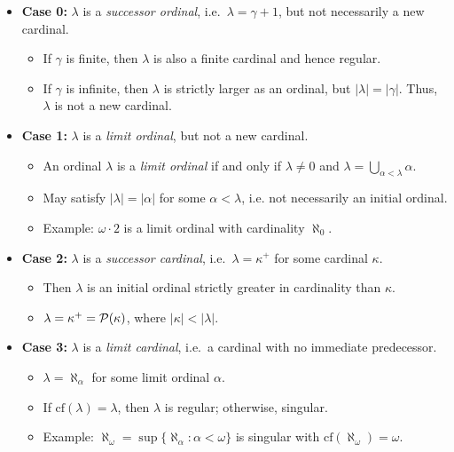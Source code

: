 \begin{itemize}
    \item \textbf{Case 0:} $\lambda$ is a \emph{successor ordinal}, i.e.\ $\lambda = \gamma + 1$, but not necessarily a new cardinal.
    \begin{itemize}
        \item If $\gamma$ is finite, then $\lambda$ is also a finite cardinal and hence regular.
        \item If $\gamma$ is infinite, then $\lambda$ is strictly larger as an ordinal, but $|\lambda| = |\gamma|$. Thus, $\lambda$ is not a new cardinal.
    \end{itemize}

    \item \textbf{Case 1:} $\lambda$ is a \emph{limit ordinal}, but not a new cardinal.
    \begin{itemize}
        \item An ordinal $\lambda$ is a \emph{limit ordinal} if and only if $\lambda \neq 0$ and $\lambda = \bigcup_{\alpha < \lambda} \alpha$.
        \item May satisfy $|\lambda| = |\alpha|$ for some $\alpha < \lambda$, i.e. not necessarily an initial ordinal.
        \item Example: $\omega \cdot 2$ is a limit ordinal with cardinality $\aleph_0$.
    \end{itemize}

    \item \textbf{Case 2:} $\lambda$ is a \emph{successor cardinal}, i.e.\ $\lambda = \kappa^+$ for some cardinal $\kappa$.
    \begin{itemize}
        \item Then $\lambda$ is an initial ordinal strictly greater in cardinality than $\kappa$.
        \item $\lambda = \kappa^+ = \mathcal{P}(\kappa)$, where $|\kappa| < |\lambda|$.
    \end{itemize}

    \item \textbf{Case 3:} $\lambda$ is a \emph{limit cardinal}, i.e.\ a cardinal with no immediate predecessor.
    \begin{itemize}
        \item $\lambda = \aleph_\alpha$ for some limit ordinal $\alpha$.
        \item If $\mathrm{cf}(\lambda) = \lambda$, then $\lambda$ is regular; otherwise, singular.
        \item Example: $\aleph_{\omega} = \sup \{\aleph_\alpha : \alpha < \omega \}$ is singular with $\mathrm{cf}(\aleph_\omega) = \omega$.
    \end{itemize}


\end{itemize}
